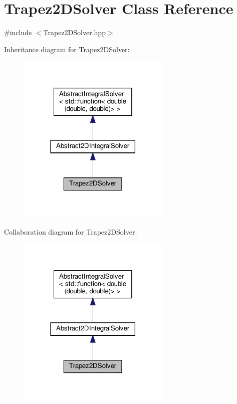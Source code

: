 \hypertarget{class_trapez2_d_solver}{}\section{Trapez2\+D\+Solver Class Reference}
\label{class_trapez2_d_solver}


{\ttfamily \#include $<$Trapez2\+D\+Solver.\+hpp$>$}



Inheritance diagram for Trapez2\+D\+Solver\+:
\nopagebreak
\begin{figure}[H]
\begin{center}
\leavevmode
\includegraphics[width=206pt]{class_trapez2_d_solver__inherit__graph}
\end{center}
\end{figure}


Collaboration diagram for Trapez2\+D\+Solver\+:
\nopagebreak
\begin{figure}[H]
\begin{center}
\leavevmode
\includegraphics[width=206pt]{class_trapez2_d_solver__coll__graph}
\end{center}
\end{figure}
